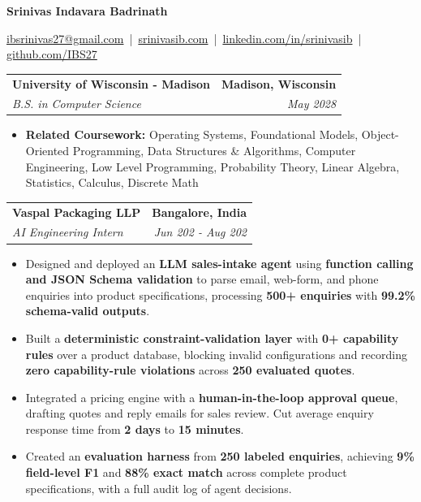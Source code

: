 \documentclass[10pt,letterpaper]{article}
\makeatletter
\newcommand{\resumeFallback}[1]{{\resumeFallbackFont#1}}
\newcommand{\resumeSection}[1]{%
  \par\vspace{2.7pt}%
  {\fontsize{11.5}{12}\selectfont\bfseries
    \underline{\makebox[\linewidth][l]{#1}}%
  }%
  \par\vspace{2.1pt}%
}
\newcommand{\resumeEntry}[4]{%
  \begin{tabular*}{\linewidth}{@{}l@{\extracolsep{\fill}}r@{}}
    \textbf{#1} & \textbf{#2} \\
    \textit{#3} & \textit{#4}
  \end{tabular*}\par
}
\newenvironment{resumeItems}{%
  \begin{itemize}[
    leftmargin=0.50in,
    label={\resumeBulletFont\textbullet},
    labelsep=0.18in,
    labelwidth=0.10in,
    itemindent=0pt,
    topsep=0pt,
    partopsep=0pt,
    parsep=0pt,
    itemsep=0.25pt
  ]
}{%
  \end{itemize}\vspace{-1.6pt}
}
\makeatother
\begin{document}
\fontsize{9.50}{12.35}\selectfont

\begin{center}
  {\fontsize{16}{17}\selectfont\bfseries Srinivas Indavara Badrinath}\par
  \vspace{1.3pt}
  {\fontsize{10.25}{11.5}\selectfont
    \href{mailto:ibsrinivas27@gmail.com}{ibsrinivas27@gmail.com}
    \,|\, \href{https://srinivasib.com}{srinivasib.com}
    \,|\, \href{https://linkedin.com/in/srinivasib}{linkedin.com/in/srinivasib}
    \,|\, \href{https://github.com/IBS27}{github.com/IBS27}
  }\par
\end{center}
\vspace{2pt}

\resumeSection{EDUCATION}
\resumeEntry
  {University of Wisconsin - Madison}
  {Madison, Wisconsin}
  {B.S. in Computer Science}
  {May 2028}
\begin{resumeItems}
  \item \textbf{Related Coursework:} Operating Systems, Foundational Models, Object-Oriented Programming, Data Structures \& Algorithms, Computer Engineering, Low Level Programming, Probability Theory, Linear Algebra, Statistics, Calculus, Discrete Math
\end{resumeItems}

\resumeSection{EXPERIENCE}
\resumeEntry
  {Vaspal Packaging LLP}
  {Bangalore, India}
  {AI Engineering Intern}
  {Jun 202\resumeFallback{6} \resumeFallback{-} Aug 202\resumeFallback{6}}
\begin{resumeItems}
  \item Designed and deployed an \textbf{LLM sales-intake agent} using \textbf{function calling and JSON Schema validation} to parse email, web-form, and phone enquiries into product specifications, processing \textbf{500+ enquiries} with \textbf{99.2\% schema-valid outputs}.
  \item Built a \textbf{deterministic constraint-validation layer} with \textbf{\resumeFallback{4}0+ capability rules} over a product database, blocking invalid configurations and recording \textbf{zero capability-rule violations} across \textbf{250 evaluated quotes}.
  \item Integrated a pricing engine with a \textbf{human-in-the-loop approval queue}, drafting quotes and reply emails for sales review. Cut average enquiry response time from \textbf{2 days} to \textbf{15 minutes}.
  \item Created an \textbf{evaluation harness} from \textbf{250 labeled enquiries}, achieving \textbf{9\resumeFallback{4}\% field-level F1} and \textbf{88\% exact match} across complete product specifications, with a full audit log of agent decisions.
\end{resumeItems}
\end{document}
